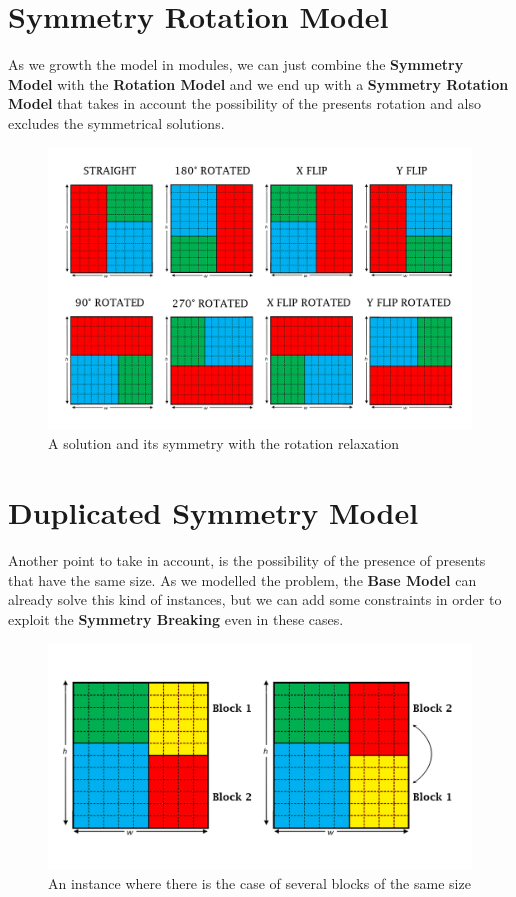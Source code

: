 \section{Symmetry Rotation Model}
As we growth the model in modules, we can just combine the \textbf{Symmetry Model} with the \textbf{Rotation Model} and we end up
with a \textbf{Symmetry Rotation Model} that takes in account the possibility of the presents rotation and also excludes the symmetrical
solutions.

\begin{figure}[ht]
	\centering
	\includegraphics[width=\textwidth]{images/rotated_simmetry.png}
	\caption{A solution and its symmetry with the rotation relaxation}
	\label{fig:overlaps}
\end{figure}



\section{Duplicated Symmetry Model}
Another point to take in account, is the possibility of the presence of presents that have the same size. As we modelled the problem,
the \textbf{Base Model} can already solve this kind of instances, but we can add some constraints in order to exploit the \textbf{Symmetry Breaking}
even in these cases.

\begin{figure}[ht]
	\centering
	\includegraphics[width=\textwidth]{images/duplicated_problem.png}
	\caption{An instance where there is the case of several blocks of the same size}
	\label{fig:overlaps}
\end{figure}

